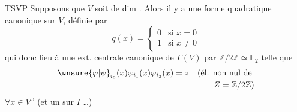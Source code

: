 \hfill TSVP
Supposons que $V$ soit de dim  . Alors
il y a une forme quadratique
canonique sur $V$, définie par
\[
q(x)=\begin{cases}0&\text{si }x=0\\1&\text{si }x\ne0\end{cases}
\]
qui  donc lieu à une ext.
centrale canonique de $\Gamma(V)$ par $\mathbb Z/2\mathbb Z\simeq\mathbb F_2$
telle que
\[
\begin{aligned}
\unsure{\varphi|\psi}_{i_0}(x)\varphi_{i_1}(x)\varphi_{i_2}(x)&=z
\quad\text{(él. non nul de}\\[-2pt]
&\hspace{4.8em}Z=\mathbb Z/2\mathbb Z\text{)}
\end{aligned}
\]
$\forall x\in V^{\omega}$ (et un  
sur $I$ \ldots)

